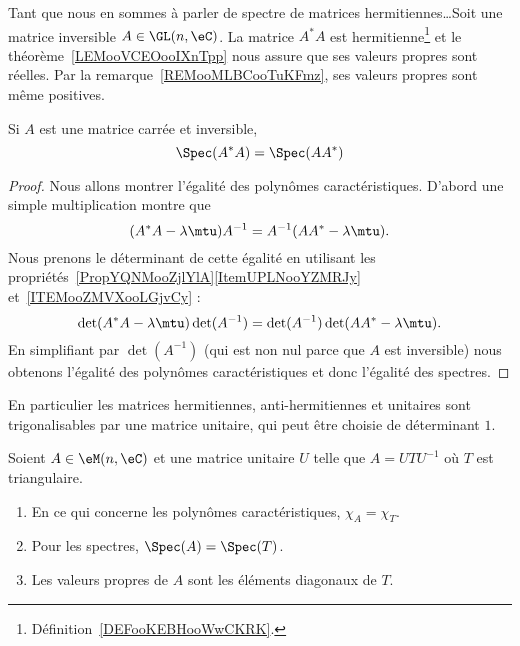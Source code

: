 Tant que nous en sommes à parler de spectre de matrices hermitiennes\ldots Soit une matrice inversible \( A\in \GL(n,\eC)\). La matrice \( A^*A\) est hermitienne\footnote{Définition~\ref{DEFooKEBHooWwCKRK}.} et le théorème~\ref{LEMooVCEOooIXnTpp} nous assure que ses valeurs propres sont réelles. Par la remarque~\ref{REMooMLBCooTuKFmz}, ses valeurs propres sont même positives.

\begin{lemma}   \label{LEMooHUGEooVYhZdZ}
	Si \( A\) est une matrice carrée et inversible,
	\begin{equation}
		\Spec(A^*A)=\Spec(AA^*)
	\end{equation}
\end{lemma}

\begin{proof}
	Nous allons montrer l'égalité des polynômes caractéristiques. D'abord une simple multiplication montre que
	\begin{equation}
		(A^*A-\lambda\mtu)A^{-1}=A^{-1}(AA^*-\lambda\mtu).
	\end{equation}
	Nous prenons le déterminant de cette égalité en utilisant les propriétés~\ref{PropYQNMooZjlYlA}\ref{ItemUPLNooYZMRJy} et~\ref{ITEMooZMVXooLGjvCy} :
	\begin{equation}
		\det(A^*A-\lambda\mtu)\det(A^{-1})=\det(A^{-1})\det(AA^*-\lambda\mtu).
	\end{equation}
	En simplifiant par \( \det(A^{-1})\) (qui est non nul parce que \( A\) est inversible) nous obtenons l'égalité des polynômes caractéristiques et donc l'égalité des spectres.
\end{proof}


En particulier les matrices hermitiennes, anti-hermitiennes et unitaires sont trigonalisables par une matrice unitaire, qui peut être choisie de déterminant \( 1\).

\begin{lemma}       \label{LEMooRCFGooPPXiKi}
	Soient \( A\in \eM(n,\eC)\) et une matrice unitaire \( U\) telle que \( A=UTU^{-1}\) où \( T\) est triangulaire.
	\begin{enumerate}
		\item
		      En ce qui concerne les polynômes caractéristiques, \( \chi_A=\chi_T\).
		\item
		      Pour les spectres, \( \Spec(A)=\Spec(T)\).
		\item
		      Les valeurs propres de \( A\) sont les éléments diagonaux de \( T\).
	\end{enumerate}
\end{lemma}

